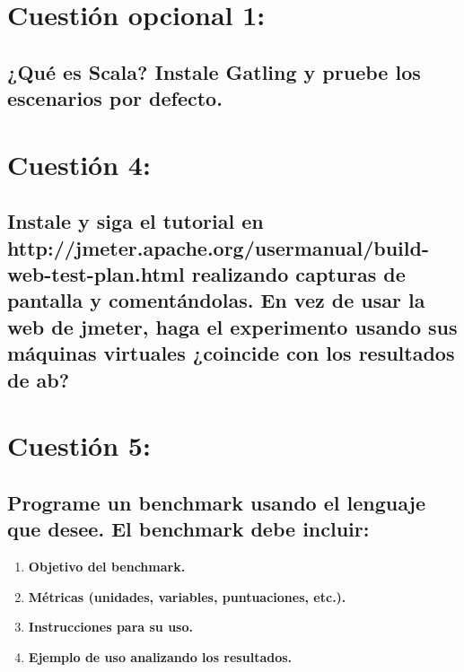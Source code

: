 
\section{Cuestión opcional 1:}

\subsection{¿Qué es Scala? Instale Gatling y pruebe los escenarios por defecto.}



\section{Cuestión 4:}

\subsection{Instale y siga el tutorial en http://jmeter.apache.org/usermanual/build-web-test-plan.html \cite{ejer4} realizando capturas de pantalla y comentándolas. En vez de usar la web de jmeter, haga el experimento usando sus máquinas virtuales ¿coincide con los resultados de ab?}





\section{Cuestión 5:}
\subsection{Programe un benchmark usando el lenguaje que desee. El benchmark debe incluir:}

\begin{enumerate}
	\item \textbf{Objetivo del benchmark.}
	\item \textbf{Métricas (unidades, variables, puntuaciones, etc.).}
	\item \textbf{Instrucciones para su uso.}
	\item \textbf{Ejemplo de uso analizando los resultados.}
\end{enumerate}

